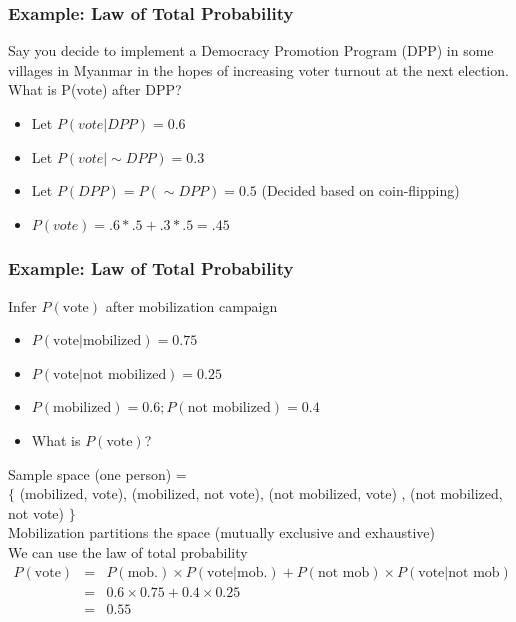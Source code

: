 \documentclass[handout]{beamer}
\numberwithin{equation}{section}
\begin{document}
\begin{frame}
\frametitle{Example: Law of Total Probability}
 Say you decide to implement a Democracy Promotion Program (DPP) in some villages in Myanmar in the hopes of increasing voter turnout at the next election. What is P(vote) after DPP?\pause
 \begin{itemize}
 \item Let $P(vote|DPP)=0.6$\pause
 \item Let $P(vote|\sim DPP)=0.3$\pause
 \item Let $P(DPP) = P(\sim DPP) = 0.5$ (Decided based on coin-flipping)\pause
 \item $P(vote)= .6*.5+.3*.5= .45$
 \end{itemize}
\end{frame}


\begin{frame}
\frametitle{Example: Law of Total Probability} 

Infer $P(\text{vote})$ after mobilization campaign \pause 
\begin{itemize}
\item[-] $P(\text{vote}|\text{mobilized} ) = 0.75$ \pause 
\item[-] $P(\text{vote}| \text{not mobilized} ) = 0.25 $ \pause 
\item[-] $P(\text{mobilized}) = 0.6 ; P(\text{not mobilized} ) = 0.4 $ \pause 
\item[-] What is $P(\text{vote})$? \pause 
\end{itemize}

Sample space (one person) = \\$\{$ (mobilized, vote), (mobilized, not vote), (not mobilized, vote) , (not mobilized, not vote) $\}$\\
\alert{Mobilization} partitions the space (mutually exclusive and exhaustive)  \pause \\
We can use the law of total probability \pause 
\begin{eqnarray}
P(\text{vote} ) & = & P(\text{mob.} ) \times P(\text{vote}| \text{mob.} ) + P(\text{not mob}) \times P(\text{vote} | \text{not mob} ) \nonumber \\
 & = & 0.6 \times 0.75 + 0.4 \times 0.25 \nonumber \\
  & = & 0.55 \nonumber 
  \end{eqnarray}

\end{frame}
\end{document}
